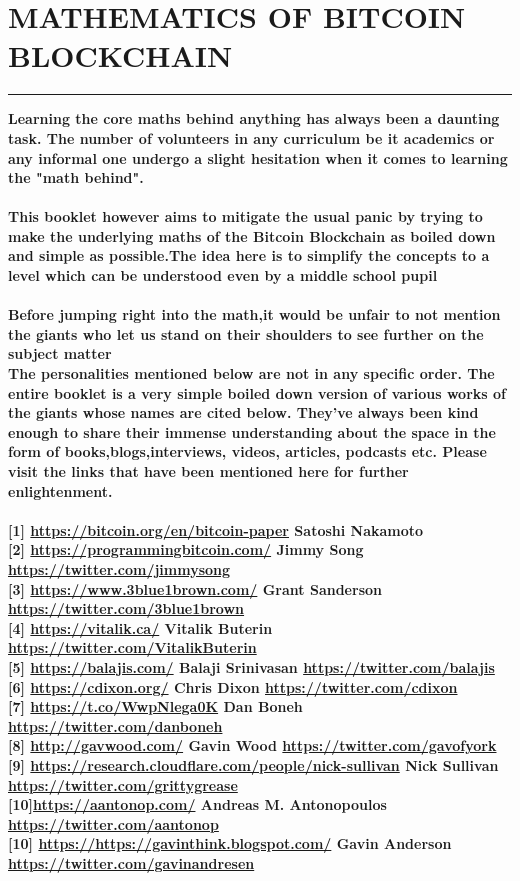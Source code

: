 \documentclass{article}
\begin{document}
\section*{ MATHEMATICS OF BITCOIN BLOCKCHAIN }
\hrule
\bigskip

\textbf{Learning the core maths behind anything has always been a daunting task. The number of volunteers in any curriculum be it academics or any informal one undergo a slight hesitation  when it comes to learning the "math behind".}
\\
\\
\textbf{This booklet however aims to mitigate the usual panic  by trying to make the underlying  maths of the Bitcoin Blockchain  as boiled down and simple  as possible.The idea here is to simplify the concepts to a level which can be understood even by a middle school pupil}
\\
\\
\textbf{Before jumping right into the math,it would be unfair to not  mention  the giants who let us stand on their shoulders to see further on the subject matter}
\\
\textbf{ The personalities mentioned below are not in any specific order. The entire booklet is a very simple boiled down version of various works of the giants whose names are cited below. They've always been kind enough to share their immense understanding about the space   in the form of books,blogs,interviews, videos, articles, podcasts etc. Please visit the links that have been mentioned here for further enlightenment. }
\\
\\
\textbf{[1] \url{https://bitcoin.org/en/bitcoin-paper} {Satoshi Nakamoto} }
\\
\textbf{[2] \url{https://programmingbitcoin.com/} Jimmy Song \quad \url{https://twitter.com/jimmysong}}
\\
\textbf{[3] \url{https://www.3blue1brown.com/} {Grant Sanderson} \quad \url{https://twitter.com/3blue1brown}}
\\
\textbf{[4] \url{https://vitalik.ca/} Vitalik Buterin \quad 
 \url{https://twitter.com/VitalikButerin}}
\\
\textbf{[5] \url {https://balajis.com/} Balaji Srinivasan \quad  \url{https://twitter.com/balajis}}
\\
\textbf{[6] \url{https://cdixon.org/} Chris Dixon \quad
    \url{https://twitter.com/cdixon}}
\\
\textbf{[7] \url{https://t.co/WwpNlega0K}  Dan Boneh \quad 
\url{https://twitter.com/danboneh} }
\\
\textbf{[8] \url {http://gavwood.com/} Gavin Wood \quad
\url {https://twitter.com/gavofyork} }
\\
\textbf{[9] \url{https://research.cloudflare.com/people/nick-sullivan}
Nick Sullivan \quad \url{https://twitter.com/grittygrease}}
\\
\textbf{[10]\url {https://aantonop.com/} Andreas M. Antonopoulos \quad 
\url{https://twitter.com/aantonop}}
\\
\textbf{[10] \url{https://https://gavinthink.blogspot.com/} Gavin Anderson \quad \url{https://twitter.com/gavinandresen}}
\end{document}
